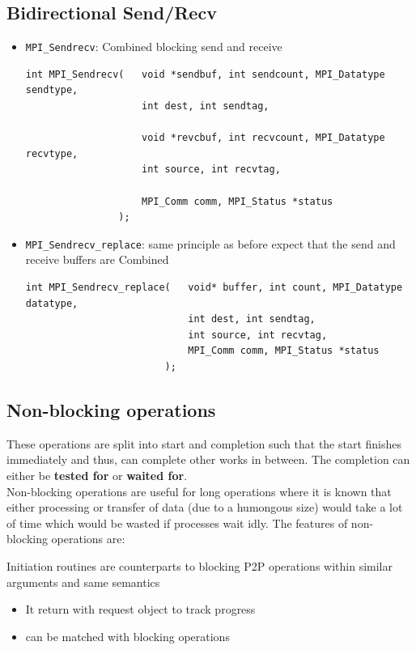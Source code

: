 \documentclass[12pt, a4paper]{report}
\begin{document}
\subsection{Bidirectional Send/Recv}
\begin{itemize}
    \item \verb$MPI_Sendrecv$: Combined blocking send and receive
    \begin{verbatim}
int MPI_Sendrecv(   void *sendbuf, int sendcount, MPI_Datatype sendtype, 
                    int dest, int sendtag,

                    void *revcbuf, int recvcount, MPI_Datatype recvtype, 
                    int source, int recvtag,

                    MPI_Comm comm, MPI_Status *status 
                );
    \end{verbatim}
    \item \verb$MPI_Sendrecv_replace$: same principle as before expect that the send and receive buffers are Combined
    \begin{verbatim}
int MPI_Sendrecv_replace(   void* buffer, int count, MPI_Datatype datatype,
                            int dest, int sendtag,
                            int source, int recvtag,
                            MPI_Comm comm, MPI_Status *status
                        );
    \end{verbatim}
\end{itemize}

\subsection{Non-blocking operations}
These operations are split into start and completion such that the start finishes immediately and thus, can complete other works in between. The completion 
can either be {\bfseries{tested for}} or {\bfseries{waited for}}.\\
Non-blocking operations are useful for long operations where it is known that either processing or transfer of data (due to a humongous size) would take a 
lot of time which would be wasted if processes wait idly.
The features of non-blocking operations are:

Initiation routines are counterparts to blocking P2P operations within similar arguments and same semantics
\begin{itemize}
    \item It return with request object to track progress
    \item can be matched with blocking operations
\end{itemize}
\end{document}
